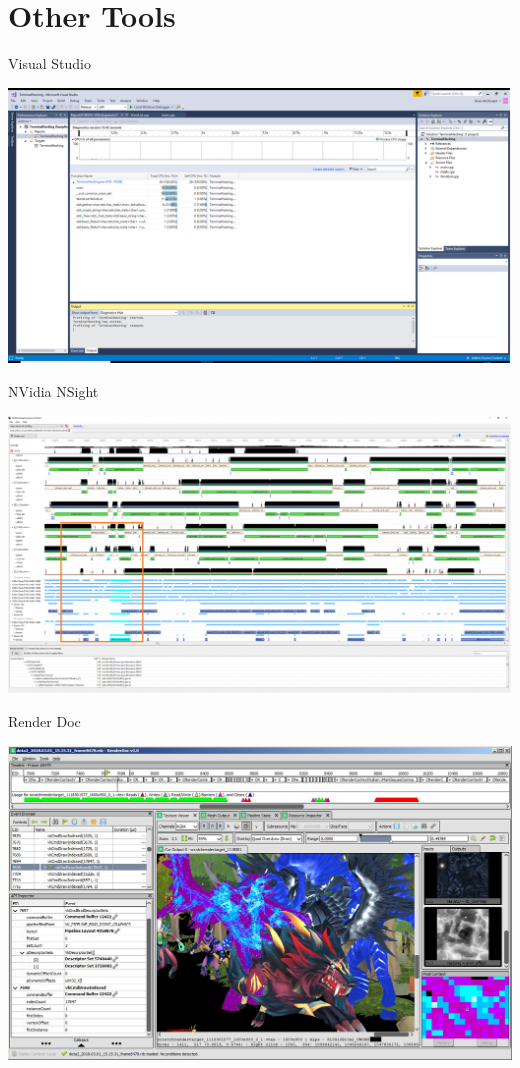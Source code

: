 \part{Other Tools}
\frame{\partpage}

\begin{frame}{Visual Studio}
	\begin{center}
		\includegraphics[width=\textwidth,height=\textheight,keepaspectratio]{VSProfilerWindow}
	\end{center}
\end{frame}


\begin{frame}{NVidia NSight}
	\begin{center}
		\includegraphics[width=\textwidth,height=\textheight,keepaspectratio]{n_sight}
	\end{center}
\end{frame}

\begin{frame}{Render Doc}
	\begin{center}
		\includegraphics[width=\textwidth,height=\textheight,keepaspectratio]{render_doc}
	\end{center}
\end{frame}
